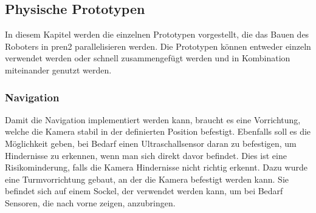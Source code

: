 
\subsection{Physische Prototypen}\label{prototyp-products}

In diesem Kapitel werden die einzelnen Prototypen vorgestellt, die das Bauen des Roboters in \acrshort{pren2} parallelisieren werden. Die Prototypen können entweder einzeln verwendet werden oder schnell zusammengefügt werden und in Kombination miteinander genutzt werden.

\subsubsection{Navigation}

Damit die Navigation implementiert werden kann, braucht es eine Vorrichtung, welche die Kamera stabil in der definierten Position befestigt. Ebenfalls soll es die Möglichkeit geben, bei Bedarf einen Ultraschallsensor daran zu befestigen, um Hindernisse zu erkennen, wenn man sich direkt davor befindet. Dies ist eine Risikominderung, falls die Kamera Hindernisse nicht richtig erkennt. Dazu wurde eine Turmvorrichtung gebaut, an der die Kamera befestigt werden kann. Sie befindet sich auf einem Sockel, der verwendet werden kann, um bei Bedarf Sensoren, die nach vorne zeigen, anzubringen.

